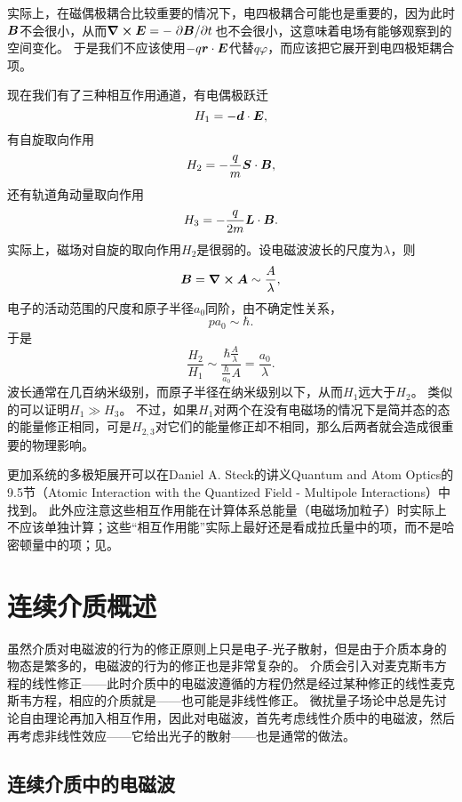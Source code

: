 实际上，在磁偶极耦合比较重要的情况下，电四极耦合可能也是重要的，因为此时$\vb*{B}$不会很小，从而$\curl{\vb*{E}} = - \pdv*{\vb*{B}}{t}$也不会很小，这意味着电场有能够观察到的空间变化。
于是我们不应该使用$-q \vb*{r} \cdot \vb*{E}$代替$q \varphi$，而应该把它展开到电四极矩耦合项。

现在我们有了三种相互作用通道，有电偶极跃迁
\begin{equation}
    H_1 = - \vb*{d} \cdot \vb*{E},
\end{equation}
有自旋取向作用
\begin{equation}
    H_2 = - \frac{q}{m} \vb*{S} \cdot \vb*{B},
\end{equation}
还有轨道角动量取向作用
\begin{equation}
    H_3 = - \frac{q}{2m} \vb*{L} \cdot \vb*{B}.
\end{equation}
实际上，磁场对自旋的取向作用${H}_2$是很弱的。设电磁波波长的尺度为$\lambda$，则
\[
    \vb*{B} = \curl{\vb*{A}} \sim \frac{A}{\lambda},
\]
电子的活动范围的尺度和原子半径$a_0$同阶，由不确定性关系，
\[
    p a_0 \sim \hbar.
\]
于是
\[
    \frac{H_2}{H_1} \sim \frac{\hbar \frac{A}{\lambda}}{\frac{\hbar}{a_0} A} = \frac{a_0}{\lambda}.
\]
波长通常在几百纳米级别，而原子半径在纳米级别以下，从而${H}_1$远大于${H}_2$。
类似的可以证明$H_1 \gg H_3$。
不过，如果$H_1$对两个在没有电磁场的情况下是简并态的态的能量修正相同，可是$H_{2,3}$对它们的能量修正却不相同，那么后两者就会造成很重要的物理影响。

更加系统的多极矩展开可以在Daniel A. Steck的讲义Quantum and Atom Optics的9.5节（Atomic Interaction with the Quantized Field - Multipole Interactions）中找到。
此外应注意这些相互作用能在计算体系总能量（电磁场加粒子）时实际上不应该单独计算；这些“相互作用能”实际上最好还是看成拉氏量中的项，而不是哈密顿量中的项；见。

\chapter{连续介质概述}

虽然介质对电磁波的行为的修正原则上只是电子-光子散射，但是由于介质本身的物态是繁多的，电磁波的行为的修正也是非常复杂的。
介质会引入对麦克斯韦方程的线性修正——此时介质中的电磁波遵循的方程仍然是经过某种修正的线性麦克斯韦方程，相应的介质就是——也可能是非线性修正。
微扰量子场论中总是先讨论自由理论再加入相互作用，因此对电磁波，首先考虑线性介质中的电磁波，然后再考虑非线性效应——它给出光子的散射——也是通常的做法。

\section{连续介质中的电磁波}

